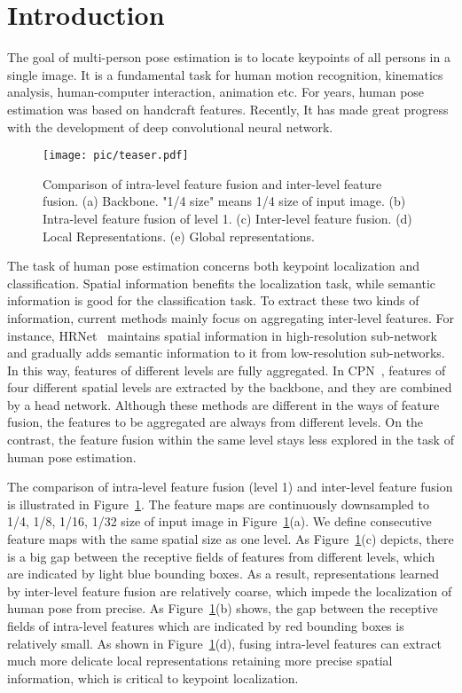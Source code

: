 \documentclass[runningheads]{llncs}
\begin{document}
\section{Introduction}
The goal of multi-person pose estimation is to locate keypoints of all persons in a single image. It is a fundamental task for human motion recognition, kinematics analysis, human-computer interaction, animation etc. For years, human pose estimation was based on handcraft features. Recently, It has made great progress with the development of deep convolutional neural network. 
\begin{figure}[h]
 \begin{center}
 \texttt{[image: pic/teaser.pdf]} \caption{Comparison of intra-level feature fusion and inter-level feature fusion. (a) Backbone. "1/4 size" means 1/4 size of input image. (b) Intra-level feature fusion of level 1. (c) Inter-level feature fusion. (d) Local Representations. (e) Global representations.} \label{fig:human} 
 \end{center}
\end{figure}
The task of human pose estimation concerns both keypoint localization and classification. Spatial information benefits the localization task, while semantic information is good for the classification task. To extract these two kinds of information, current methods mainly focus on aggregating inter-level features. For instance, HRNet~\cite{hrnet} maintains spatial information in high-resolution sub-network and gradually adds semantic information to it from low-resolution sub-networks. In this way, features of different levels are fully aggregated. In CPN~\cite{cpn}, features of four different spatial levels are extracted by the backbone, and they are combined by a head network. Although these methods are different in the ways of feature fusion, the features to be aggregated are always from different levels. On the contrast, the feature fusion within the same level stays less explored in the task of human pose estimation. 

The comparison of intra-level feature fusion (level 1) and inter-level feature fusion is illustrated in Figure~\ref{fig:human}. The feature maps are continuously downsampled to 1/4, 1/8, 1/16, 1/32 size of input image in Figure~\ref{fig:human}(a). We define consecutive feature maps with the same spatial size as one level. As Figure~\ref{fig:human}(c) depicts, there is a big gap between the receptive fields of features from different levels, which are indicated by light blue bounding boxes. As a result, representations learned by inter-level feature fusion are relatively coarse, which impede the localization of human pose from precise. As Figure~\ref{fig:human}(b) shows, the gap between the receptive fields of intra-level features which are indicated by red bounding boxes is relatively small. As shown in Figure~\ref{fig:human}(d), fusing intra-level features can extract much more delicate local representations retaining more precise spatial information, which is critical to keypoint localization. 
\end{document}
